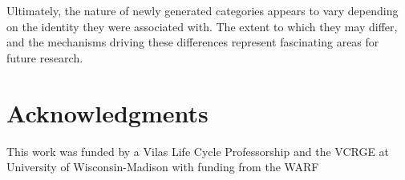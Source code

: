 \documentclass[10pt,letterpaper]{article}
\begin{document}
Ultimately, the nature of newly generated categories appears to vary depending on the identity they were associated
with. The extent to which they may differ, and the mechanisms driving these differences represent fascinating areas for
future research.

\section{Acknowledgments}
This work was funded by a Vilas Life Cycle Professorship and the VCRGE at University of Wisconsin-Madison with funding from the WARF





\setlength{\bibleftmargin}{.125in}
\setlength{\bibindent}{-\bibleftmargin}


\end{document}
